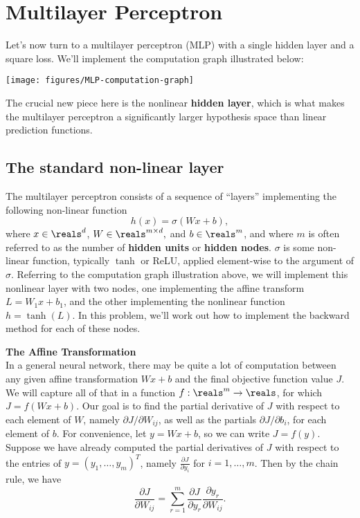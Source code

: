\documentclass{article}
\newcommand{\nyuparagraph}[1]{\vspace{0.3cm}\textcolor{nyupurple}{\bf \large #1}\\}
\theoremstyle{plain}
\theoremstyle{definition}
\begin{document}
\section{Multilayer Perceptron}

Let's now turn to a multilayer perceptron (MLP)
with a single hidden layer and a square loss. We'll implement the
computation graph illustrated below:
\begin{center}
\texttt{[image: figures/MLP-computation-graph]}
\par\end{center}

The crucial new piece here is the nonlinear \textbf{hidden layer},
which is what makes the multilayer perceptron a significantly larger
hypothesis space than linear prediction functions.

\subsection{The standard non-linear layer}

The multilayer perceptron consists of a sequence of ``layers'' implementing
the following non-linear function
\[
h(x)=\sigma\left(Wx+b\right),
\]
where $x\in\reals^{d}$, $W\in\reals^{m\times d},$ and $b\in\reals^{m}$,
and where $m$ is often referred to as the number of\textbf{ hidden
units }or\textbf{ hidden nodes}. $\sigma$ is some non-linear function,
typically $\tanh$ or ReLU, applied element-wise to the argument of
$\sigma$. Referring to the computation graph illustration above,
we will implement this nonlinear layer with two nodes, one implementing
the affine transform $L=W_{1}x+b_{1}$, and the other implementing
the nonlinear function $h=\tanh(L)$. In this problem, we'll work
out how to implement the backward method for each of these nodes.

\nyuparagraph{The Affine Transformation}

In a general neural network, there may be quite a lot of computation
between any given affine transformation $Wx+b$ and the final objective
function value $J$. We will capture all of that in a function $f:\reals^{m}\to\reals$,
for which $J=f(Wx+b)$. Our goal is to find the partial derivative
of $J$ with respect to each element of $W$, namely $\partial J/\partial W_{ij}$,
as well as the partials $\partial J/\partial b_{i}$, for each element
of $b$. For convenience, let $y=Wx+b$, so we can write $J=f(y)$.
Suppose we have already computed the partial derivatives of $J$ with
respect to the entries of $y=\left(y_{1},\ldots,y_{m}\right)^{T}$,
namely $\frac{\partial J}{\partial y_{i}}$ for $i=1,\ldots,m$. Then
by the chain rule, we have
\[
\frac{\partial J}{\partial W_{ij}}=\sum_{r=1}^{m}\frac{\partial J}{\partial y_{r}}\frac{\partial y_{r}}{\partial W_{ij}}.
\]
\end{document}
